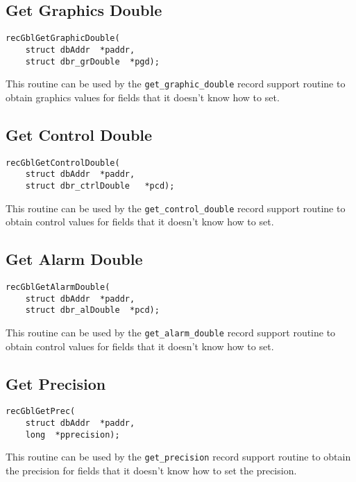 \subsection{Get Graphics Double}

\begin{verbatim}
recGblGetGraphicDouble(
    struct dbAddr  *paddr,
    struct dbr_grDouble  *pgd);
\end{verbatim}

This routine can be used by the \verb|get_graphic_double| record support routine to obtain graphics values for fields that 
it doesn't know how to set.

\subsection{Get Control Double}

\begin{verbatim}
recGblGetControlDouble(
    struct dbAddr  *paddr,
    struct dbr_ctrlDouble   *pcd);
\end{verbatim}

This routine can be used by the \verb|get_control_double| record support routine to obtain control values for fields that it 
doesn't know how to set.

\subsection{Get Alarm Double}

\begin{verbatim}
recGblGetAlarmDouble(
    struct dbAddr  *paddr,
    struct dbr_alDouble  *pcd);
\end{verbatim}

This routine can be used by the \verb|get_alarm_double| record support routine to obtain control values for fields that it 
doesn't know how to set.

\subsection{Get Precision}

\begin{verbatim}
recGblGetPrec(
    struct dbAddr  *paddr,
    long  *pprecision);
\end{verbatim}

This routine can be used by the \verb|get_precision| record support routine to obtain the precision for fields that it doesn't 
know how to set the precision.

